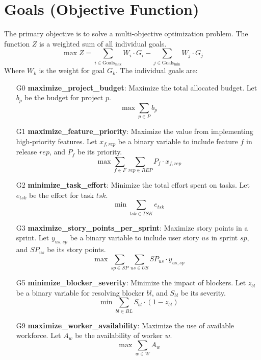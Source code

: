 \documentclass{article}
\begin{document}
\section{Goals (Objective Function)}
The primary objective is to solve a multi-objective optimization problem. The function $Z$ is a weighted sum of all individual goals.
$$ \max Z = \sum_{i \in \text{Goals}_{\max}} W_i \cdot G_i - \sum_{j \in \text{Goals}_{\min}} W_j \cdot G_j $$
Where $W_k$ is the weight for goal $G_k$. The individual goals are:
\begin{itemize}
    \item[G0] \textbf{maximize\_project\_budget}: Maximize the total allocated budget. Let $b_p$ be the budget for project $p$.
    $$ \max \sum_{p \in P} b_p $$
    \item[G1] \textbf{maximize\_feature\_priority}: Maximize the value from implementing high-priority features. Let $x_{f,rep}$ be a binary variable to include feature $f$ in release $rep$, and $P_f$ be its priority.
    $$ \max \sum_{f \in F} \sum_{rep \in REP} P_f \cdot x_{f,rep} $$
    \item[G2] \textbf{minimize\_task\_effort}: Minimize the total effort spent on tasks. Let $e_{tsk}$ be the effort for task $tsk$.
    $$ \min \sum_{tsk \in TSK} e_{tsk} $$
    \item[G3] \textbf{maximize\_story\_points\_per\_sprint}: Maximize story points in a sprint. Let $y_{us,sp}$ be a binary variable to include user story $us$ in sprint $sp$, and $SP_{us}$ be its story points.
    $$ \max \sum_{sp \in SP} \sum_{us \in US} SP_{us} \cdot y_{us,sp} $$
    \item[G5] \textbf{minimize\_blocker\_severity}: Minimize the impact of blockers. Let $z_{bl}$ be a binary variable for resolving blocker $bl$, and $S_{bl}$ be its severity.
    $$ \min \sum_{bl \in BL} S_{bl} \cdot (1 - z_{bl}) $$
    \item[G9] \textbf{maximize\_worker\_availability}: Maximize the use of available workforce. Let $A_w$ be the availability of worker $w$.
    $$ \max \sum_{w \in W} A_w $$
\end{itemize}
\end{document}
